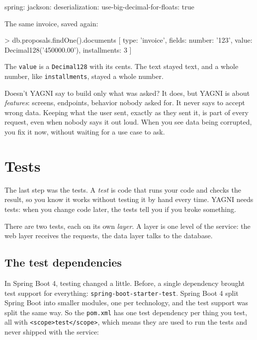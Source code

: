 \begin{code}[language={}]
spring:
  jackson:
    deserialization:
      use-big-decimal-for-floats: true
\end{code}

The same invoice, saved again:

\begin{terminal}
> db.proposals.findOne().documents
[
  {
    type: 'invoice',
    fields: { number: '123', value: Decimal128('450000.00'), installments: 3 }
  }
]
\end{terminal}

The \texttt{value} is a \texttt{Decimal128} with its cents. The text stayed
text, and a whole number, like \texttt{installments}, stayed a whole number.

\begin{reflection}{Doesn't YAGNI say to build only what was asked?}
It does, but YAGNI is about \emph{features}: screens, endpoints, behavior
nobody asked for. It never says to accept wrong data. Keeping what the user
sent, exactly as they sent it, is part of every request, even when nobody
says it out loud. When you see data being corrupted, you fix it now, without
waiting for a use case to ask.
\end{reflection}

\section{Tests}

The last step was the tests. A \emph{test} is code that runs your code and
checks the result, so you know it works without testing it by hand every
time. YAGNI needs tests: when you change code later, the tests tell you if you
broke something.

There are two tests, each on its own \emph{layer}. A layer is one level of
the service: the web layer receives the requests, the data layer talks to the
database.

\subsection*{The test dependencies}

In Spring Boot 4, testing changed a little. Before, a single dependency
brought test support for everything: \texttt{spring-boot-starter-test}. Spring
Boot 4 split Spring Boot into smaller modules, one per technology, and the test
support was split the same way. So the \texttt{pom.xml} has one test
dependency per thing you test, all with \texttt{<scope>test</scope>}, which
means they are used to run the tests and never shipped with the service:

